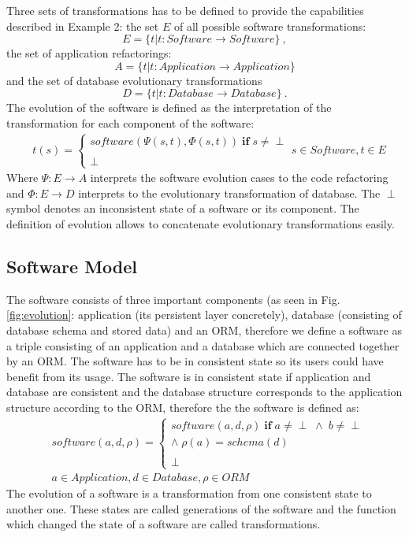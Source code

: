 \documentclass[runningheads]{comsis}
\begin{document}
Three sets of transformations has to be defined to provide the capabilities described in Example 2: the set $E$ of all possible software transformations:
\begin{equation}
E = \{t | t: Software \rightarrow Software\}\:,
\end{equation}
the set of application refactorings:
\begin{equation}
A = \{t | t: Application \rightarrow Application\}
\end{equation}
and the set of database evolutionary transformations
\begin{equation}
 D = \{t | t: Database \rightarrow Database\}\:.
\end{equation}
The evolution of the software is defined as the interpretation of the transformation for each component of the software:
\begin{align}
& t(s) = \begin{cases}
software(\Psi(s, t), \Phi(s,t)) \; \mathbf{if} \; s \neq \perp \\\\
 	\perp
\end{cases}
s \in Software, t \in E \nonumber
\end{align}
Where $\Psi : E \rightarrow A $ interprets the software evolution cases to the code refactoring and $\Phi : E \rightarrow D $ interprets to the evolutionary transformation of database. The $\perp$ symbol denotes an inconsistent state of a software or its component. The definition of evolution allows to concatenate evolutionary transformations easily. 

\subsection{Software Model}
The software consists of three important components (as seen in Fig. \ref{fig:evolution}: application (its persistent layer concretely), database (consisting of database schema and stored data) and an ORM, therefore we define a software as a triple consisting of an application and a database which are connected together by an ORM.
The software has to be in consistent state so its users could have benefit from its usage. The software is in consistent state if application and database are consistent and the database structure corresponds to the application structure according to the ORM, therefore the the software is defined as:
\begin{align}
& software(a, d, \rho) = \begin{cases}
 software(a, d, \rho) \; \textbf{if} \; a \neq \perp \; \wedge \; b \neq \perp \\ \wedge \; \rho(a) = schema(d) 
 \\\\
 \perp
 \end{cases}\\
& a \in Application, d \in Database, \rho \in ORM \nonumber
\end{align}
The evolution of a software is a transformation from one consistent state to another one. These states are called generations of the software and the function which changed the state of a software are called transformations. 
\end{document}
